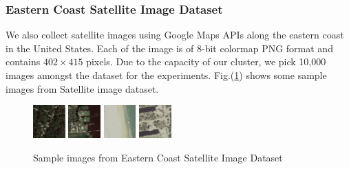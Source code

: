 \documentclass{acm_proc_article-sp}
\begin{document}
\subsubsection{Eastern Coast Satellite Image Dataset}
We also collect satellite images using Google Maps APIs along the eastern coast in the United States. Each of the image is of 8-bit colormap PNG format and contains $402\times415$ pixels. Due to the capacity of our cluster, we pick 10,000 images amongst the dataset for the experiments. Fig.(\ref{fig:gmaps}) shows some sample images from Satellite image dataset.
\begin{figure}[!htb]
\centering
\includegraphics[width=0.11\textwidth]{fig/sample-gmaps1}
\includegraphics[width=0.11\textwidth]{fig/sample-gmaps2}
\includegraphics[width=0.11\textwidth]{fig/sample-gmaps3}
\includegraphics[width=0.11\textwidth]{fig/sample-gmaps4}
\caption{Sample images from Eastern Coast Satellite Image Dataset}\label{fig:gmaps}
\end{figure}
\end{document}
